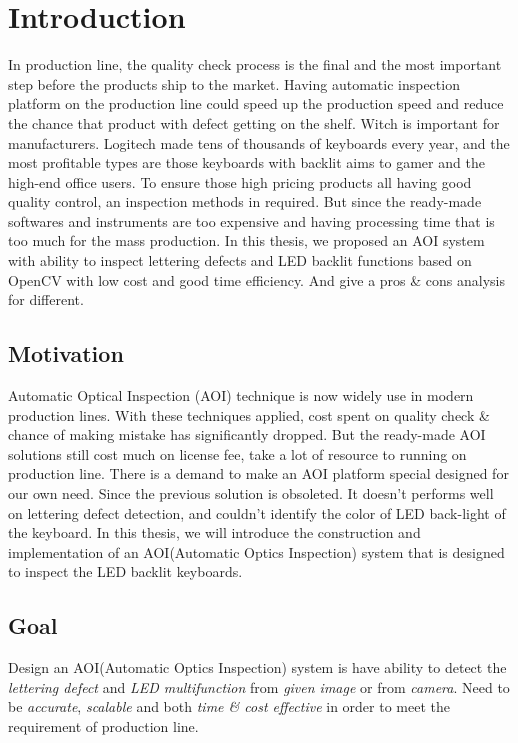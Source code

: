 \chapter{Introduction}
\label{c:intro}
	In production line, the quality check process is the final and the most important step before the
	products ship to the market.
	Having automatic inspection platform on the production line could speed up the production speed and reduce the chance that product with defect getting on the shelf.
	Witch is important for manufacturers.
	Logitech made tens of thousands of keyboards every year, and the most profitable types are those keyboards with backlit aims to gamer and the high-end office users.
	To ensure those high pricing products all having good quality control, an inspection methods in required.
	But since the ready-made softwares and instruments are too expensive and having processing time that is too much for the mass production.
	In this thesis, we proposed an AOI system with ability to inspect lettering defects and LED backlit functions based on OpenCV with low cost and good time efficiency.
	And give a pros \& cons analysis for different.


\section{Motivation} \label{section:motivation} 
	Automatic Optical Inspection (AOI) technique is now widely use in modern production lines.
	With these techniques applied, cost spent on quality check \& chance of making mistake has significantly dropped.
	But the ready-made AOI solutions still cost much on license fee, take a lot of resource to running on production line.
	There is a demand to make an AOI platform special designed for our own need.
	Since the previous solution is obsoleted. It doesn't performs well on lettering defect detection, 
	and couldn't identify the color of LED back-light of the keyboard.
	In this thesis, we will introduce the construction and implementation of an AOI(Automatic Optics Inspection) system that is designed to inspect the LED backlit keyboards.


\section{Goal} \label{section:goal}
	Design an AOI(Automatic Optics Inspection) system is have ability to detect the \emph{lettering defect} and \emph{LED multifunction} from \emph{given image} or from \emph{camera}.
	Need to be \emph{accurate}, \emph{scalable} and both \emph{time \& cost effective} in order to meet the requirement of production line.

